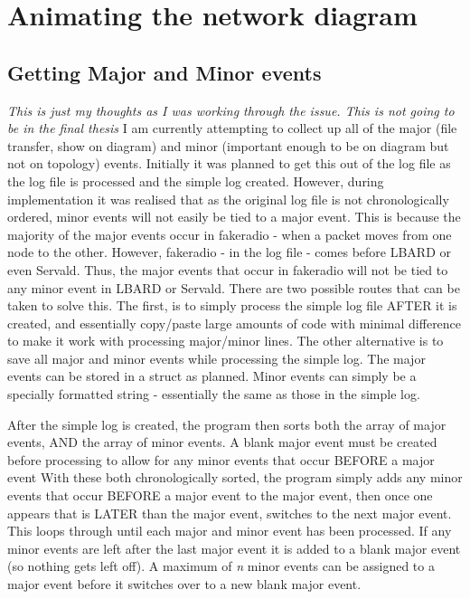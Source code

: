 \section{Animating the network diagram}

\subsection{Getting Major and Minor events}
\emph{This is just my thoughts as I was working through the issue. This is not going to be in the final thesis}
I am currently attempting to collect up all of the major (file transfer, show on diagram) and minor (important enough to be on diagram but not on topology) events.
Initially it was planned to get this out of the log file as the log file is processed and the simple log created. 
However, during implementation it was realised that as the original log file is not chronologically ordered, minor events will not easily be tied to a major event.
This is because the majority of the major events occur in fakeradio - when a packet moves from one node to the other.
However, fakeradio - in the log file - comes before LBARD or even Servald.
Thus, the major events that occur in fakeradio will not be tied to any minor event in LBARD or Servald.
There are two possible routes that can be taken to solve this. 
The first, is to simply process the simple log file AFTER it is created, and essentially copy/paste large amounts of code with minimal difference to make it work with processing major/minor lines.
The other alternative is to save all major and minor events while processing the simple log.
The major events can be stored in a struct as planned.
Minor events can simply be a specially formatted string - essentially the same as those in the simple log.

After the simple log is created, the program then sorts both the array of major events, AND the array of minor events.
A blank major event must be created before processing to allow for any minor events that occur BEFORE a major event 
With these both chronologically sorted, the program simply adds any minor events that occur BEFORE a major event to the major event, then once one appears that is LATER than the major event, switches to the next major event.
This loops through until each major and minor event has been processed.
If any minor events are left after the last major event it is added to a blank major event (so nothing gets left off).
A maximum of \emph{n} minor events can be assigned to a major event before it switches over to a new blank major event.

